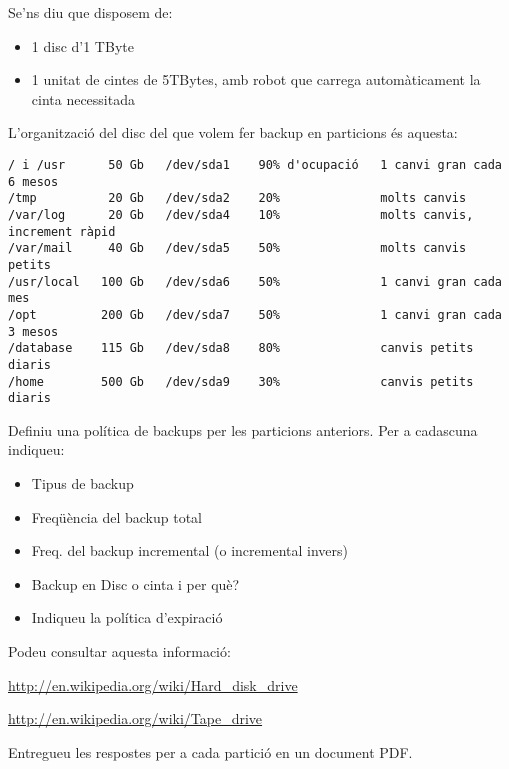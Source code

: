 
    Se'ns diu que disposem de:

    \begin{itemize}
        \item 1 disc d'1 TByte
        \item 1 unitat de cintes de 5TBytes, amb robot que carrega automàticament la cinta necessitada
    \end{itemize}

    L'organització del disc del que volem fer backup en particions és aquesta:

    \begin{verbatim}
/ i /usr      50 Gb   /dev/sda1    90% d'ocupació   1 canvi gran cada 6 mesos
/tmp          20 Gb   /dev/sda2    20%              molts canvis
/var/log      20 Gb   /dev/sda4    10%              molts canvis, increment ràpid
/var/mail     40 Gb   /dev/sda5    50%              molts canvis petits
/usr/local   100 Gb   /dev/sda6    50%              1 canvi gran cada mes
/opt         200 Gb   /dev/sda7    50%              1 canvi gran cada 3 mesos
/database    115 Gb   /dev/sda8    80%              canvis petits diaris
/home        500 Gb   /dev/sda9    30%              canvis petits diaris
    \end{verbatim}

    Definiu una política de backups per les particions anteriors. Per a cadascuna indiqueu:

    \begin{itemize}
        \item Tipus de backup
        \item Freqüència del backup total
        \item Freq. del backup incremental (o incremental invers)
        \item Backup en Disc o cinta i per què?
        \item Indiqueu la política d'expiració
    \end{itemize}

    Podeu consultar aquesta informació:

    \url{http://en.wikipedia.org/wiki/Hard_disk_drive}

    \url{http://en.wikipedia.org/wiki/Tape_drive}

    Entregueu les respostes per a cada partició en un document PDF.
